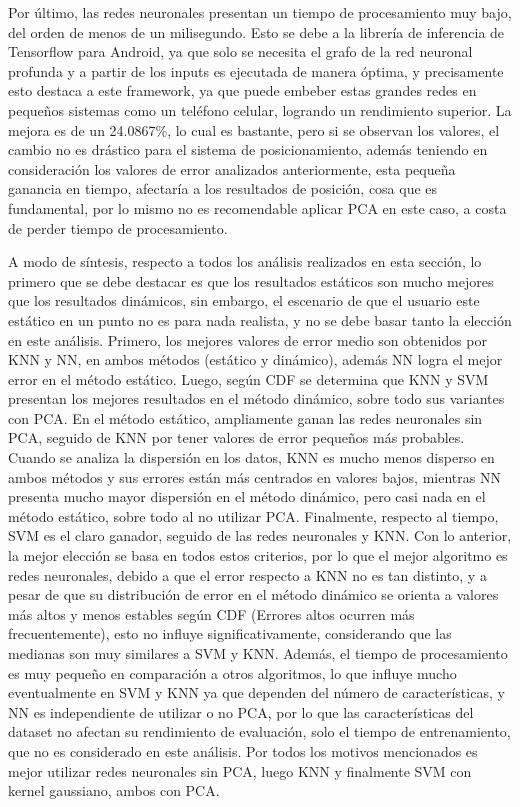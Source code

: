 Por último, las redes neuronales presentan un tiempo de procesamiento muy bajo, del orden de menos de un milisegundo. Esto se debe a la librería de inferencia de Tensorflow para Android, ya que solo se necesita el grafo de la red neuronal profunda y a partir de los inputs es ejecutada de manera óptima, y precisamente esto destaca a este framework, ya que puede embeber estas grandes redes en pequeños sistemas como un teléfono celular, logrando un rendimiento superior. La mejora es de un 24.0867\%, lo cual es bastante, pero si se observan los valores, el cambio no es drástico para el sistema de posicionamiento, además teniendo en consideración los valores de error analizados anteriormente, esta pequeña ganancia en tiempo, afectaría a los resultados de posición, cosa que es fundamental, por lo mismo no es recomendable aplicar PCA en este caso, a costa de perder tiempo de procesamiento.


A modo de síntesis, respecto a todos los análisis realizados en esta sección, lo primero que se debe destacar es que los resultados estáticos son mucho mejores que los resultados dinámicos, sin embargo, el escenario de que el usuario este estático en un punto no es para nada realista, y no se debe basar tanto la elección en este análisis. Primero, los mejores valores de error medio son obtenidos por KNN y NN, en ambos métodos (estático y dinámico), además NN logra el mejor error en el método estático. Luego, según CDF se determina que KNN y SVM presentan los mejores resultados en el método dinámico, sobre todo sus variantes con PCA. En el método estático, ampliamente ganan las redes neuronales sin PCA, seguido de KNN por tener valores de error pequeños más probables. Cuando se analiza la dispersión en los datos, KNN es mucho menos disperso en ambos métodos y sus errores están más centrados en valores bajos, mientras NN presenta mucho mayor dispersión en el método dinámico, pero casi nada en el método estático, sobre todo al no utilizar PCA. Finalmente, respecto al tiempo, SVM es el claro ganador, seguido de las redes neuronales y KNN. Con lo anterior, la mejor elección se basa en todos estos criterios, por lo que el mejor algoritmo es redes neuronales, debido a que el error respecto a KNN no es tan distinto, y a pesar de que su distribución de error en el método dinámico se orienta a valores más altos y menos estables según CDF (Errores altos ocurren más frecuentemente), esto no influye significativamente, considerando que las medianas son muy similares a SVM y KNN. Además, el tiempo de procesamiento es muy pequeño en comparación a otros algoritmos, lo que influye mucho eventualmente en SVM y KNN ya que dependen del número de características, y NN es independiente de utilizar o no PCA, por lo que las características del dataset no afectan su rendimiento de evaluación, solo el tiempo de entrenamiento, que no es considerado en este análisis. Por todos los motivos mencionados es mejor utilizar redes neuronales sin PCA, luego KNN y finalmente SVM con kernel gaussiano, ambos con PCA.

